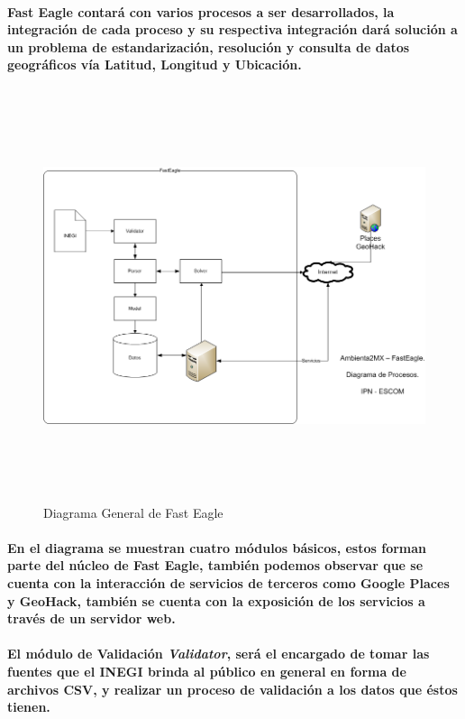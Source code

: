 	  	\paragraph{Fast Eagle contará con varios procesos a ser desarrollados, la integración de cada proceso y su respectiva integración dará solución a un problema de estandarización, resolución y consulta de datos geográficos vía Latitud, Longitud y Ubicación.}
	  	\newpage
	  	\begin{landscape}
		  	\begin{figure}[h!]
		  	\centering
			  \includegraphics[width=22.5cm,height=12cm]{./images/DiagramaFastEagle.png}
			  \caption{Diagrama General de Fast Eagle}
			\end{figure}
	  	\end{landscape}
	  \newpage
	  \paragraph{En el diagrama se muestran cuatro módulos básicos, estos forman parte del núcleo de Fast Eagle, también podemos observar que se cuenta con la interacción de servicios de terceros como Google Places y GeoHack, también se cuenta con la exposición de los servicios a través de un servidor  web.}
	  \paragraph{El módulo de Validación \textbf{\emph{Validator}}, será el encargado de tomar las fuentes que el INEGI brinda al público en general en forma de archivos CSV, y realizar un proceso de validación a los datos que éstos tienen.}
